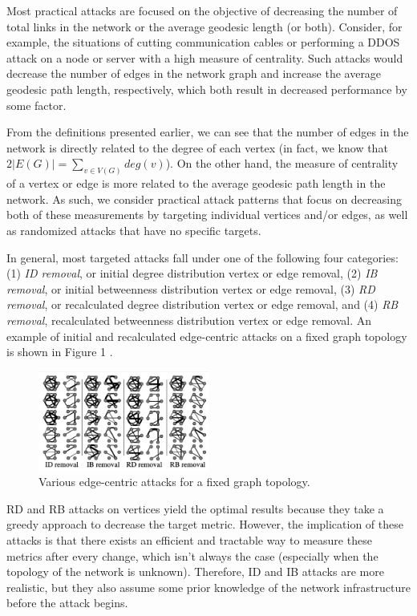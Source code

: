 \documentclass[doc]{apa}%
\begin{document}
Most practical attacks are focused on the objective of decreasing the number of total links in the network or the average geodesic length (or both). Consider, for example, the situations of cutting communication cables or performing a DDOS attack on a node or server with a high measure of centrality. Such attacks would decrease the number of edges in the network graph and increase the average geodesic path length, respectively, which both result in decreased performance by some factor.

From the definitions presented earlier, we can see that the number of edges in the network is directly related to the degree of each vertex (in fact, we know that $2|E(G)| =\sum_{v \in V(G)}deg(v)$). On the other hand, the measure of centrality of a vertex or edge is more related to the average geodesic path length in the network. As such, we consider practical attack patterns that focus on decreasing both of these measurements by targeting individual vertices and/or edges, as well as randomized attacks that have no specific targets. 

In general, most targeted attacks fall under one of the following four categories: (1) \emph{ID removal}, or initial degree distribution vertex or edge removal, (2) \emph{IB removal}, or initial betweenness distribution vertex or edge removal, (3) \emph{RD removal}, or recalculated degree distribution vertex or edge removal, and (4) \emph{RB removal}, recalculated betweenness distribution vertex or edge removal. An example of initial and recalculated edge-centric attacks on a fixed graph topology is shown in Figure 1 \cite{Attacks}.

\begin{figure}[h!]
	\label{fig:attackPics}
	\centering
		\includegraphics[width=0.5\textwidth]{edge_attacks.png}
	\caption{Various edge-centric attacks for a fixed graph topology.}
\end{figure}

RD and RB attacks on vertices yield the optimal results because they take a greedy approach to decrease the target metric. However, the implication of these attacks is that there exists an efficient and tractable way to measure these metrics after every change, which isn't always the case (especially when the topology of the network is unknown). Therefore, ID and IB attacks are more realistic, but they also assume some prior knowledge of the network infrastructure before the attack begins. 
\end{document}
